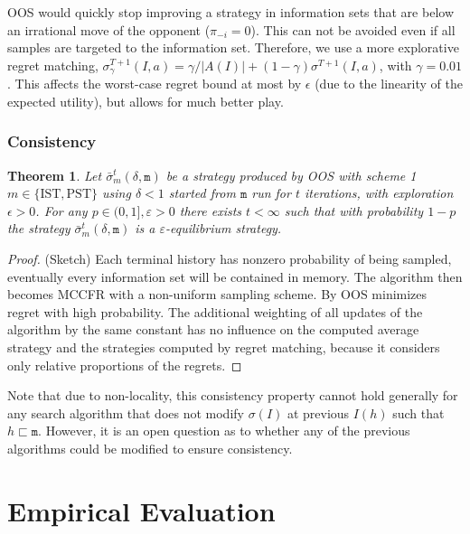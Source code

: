 \documentclass{aamas2015}
\newcommand{\ttm}{\mathtt{m}}
\newtheorem{theorem}{Theorem}
\begin{document}
OOS would quickly stop improving a strategy in information sets that are below an irrational move of the opponent ($\pi_{-i}=0$). This can not be avoided even if all samples are targeted to the information set. Therefore, we use a more explorative regret matching, 
$\sigma^{T+1}_\gamma(I,a) = \gamma/|A(I)| + (1-\gamma) \sigma^{T+1}(I,a)$, with $\gamma = 0.01$. 
This affects the worst-case regret bound at most by $\epsilon$ (due to the linearity of the expected utility), but allows for much better play.



\subsubsection{Consistency}

\begin{theorem}
Let $\bar{\sigma}^t_m(\delta,\ttm)$ be a strategy produced by OOS with scheme 1$m \in \{ \mbox{IST}, \mbox{PST} \}$ 
using $\delta < 1$ started from $\ttm$ run for $t$ iterations, with exploration $\epsilon > 0$.  
For any $p \in (0, 1], \varepsilon > 0$ there exists $t < \infty$ such that with 
probability $1-p$ the strategy  $\bar{\sigma}^t_m(\delta,\ttm)$ is a $\varepsilon$-equilibrium strategy. 
\label{thm:consistency}
\end{theorem}
\begin{proof}(Sketch) Each terminal history has nonzero probability of being sampled, eventually every information 
set will be contained in memory. The algorithm then becomes MCCFR with a non-uniform sampling scheme.
By \cite[Theorem 5]{Lanctot09Sampling} OOS minimizes regret with high probability. The additional weighting of all updates of the algorithm by the same constant has no influence on the computed average strategy and the strategies computed by regret matching, because it considers only relative proportions of the regrets.
\end{proof}

Note that due to non-locality, this consistency property cannot hold generally for any search 
algorithm that does not modify $\sigma(I)$ at previous $I(h)$ such that $h \sqsubset \ttm$. However, 
it is an open question as to whether any of the previous algorithms could be modified to ensure 
consistency.

\section{Empirical Evaluation}
\end{document}
